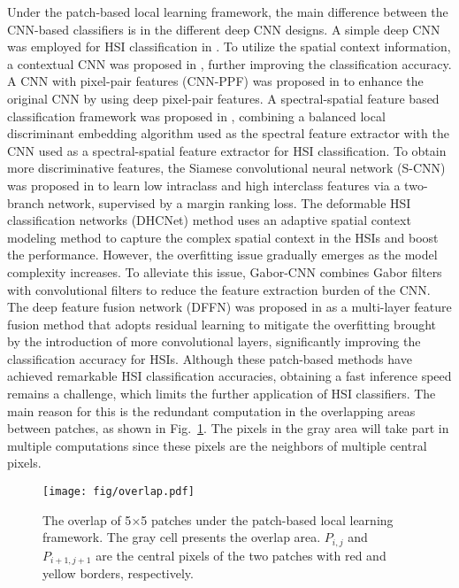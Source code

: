 \documentclass[journal]{IEEEtran}
\begin{document}
Under the patch-based local learning framework, the main difference between the CNN-based classifiers is in the different deep CNN designs.
A simple deep CNN was employed for HSI classification in \cite{hu2015deep}.
To utilize the spatial context information, a contextual CNN was proposed in \cite{lee2016contextual}, further improving the classification accuracy.
A CNN with pixel-pair features (CNN-PPF) was proposed in \cite{li2016hyperspectral} to enhance the original CNN by using deep pixel-pair features.
A spectral-spatial feature based classification framework was proposed in \cite{zhao2016spectral}, combining a balanced local discriminant embedding algorithm used as the spectral feature extractor with the CNN used as a spectral-spatial feature extractor for HSI classification.
To obtain more discriminative features, the Siamese convolutional neural network (S-CNN) was proposed in \cite{liu2017supervised} to learn low intraclass and high interclass features via a two-branch network, supervised by a margin ranking loss.
The deformable HSI classification networks (DHCNet) method \cite{zhu2018deformable} uses an adaptive spatial context modeling method to capture the complex spatial context in the HSIs and boost the performance.
However, the overfitting issue gradually emerges as the model complexity increases.
To alleviate this issue, Gabor-CNN \cite{chen2017hyperspectral} combines Gabor filters with convolutional filters to reduce the feature extraction burden of the CNN.
The deep feature fusion network (DFFN) was proposed in \cite{song2018hyperspectral} as a multi-layer feature fusion method that adopts residual learning to mitigate the overfitting brought by the introduction of more convolutional layers, significantly improving the classification accuracy for HSIs.
Although these patch-based methods have achieved remarkable HSI classification accuracies,
obtaining a fast inference speed remains a challenge, which limits the further application of HSI classifiers.
The main reason for this is the redundant computation in the overlapping areas between patches, as shown in Fig.~\ref{fig:overlap}.
The pixels in the gray area will take part in multiple computations since these pixels are the neighbors of multiple central pixels.

\begin{figure}
  \centering
  \texttt{[image: fig/overlap.pdf]}
  \caption{The overlap of 5$\times$5 patches under the patch-based local learning framework. The gray cell presents the overlap area. $P_{i,j}$ and $P_{i+1, j+1}$ are the central pixels of the two patches with red and yellow borders, respectively.}
  \label{fig:overlap}
\end{figure}
\end{document}
